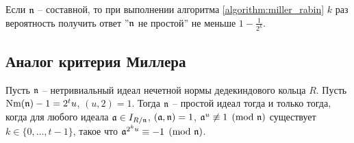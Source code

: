 \documentclass[_00_dissertation.tex]{subfiles}
\begin{document}
\begin{remark}
    Если $\mathfrak{n}$ -- составной, то при выполнении алгоритма \ref{algorithm:miller_rabin} $k$ раз вероятность получить ответ ''$\mathfrak{n}$ не простой'' не меньше $1 - \frac{1}{2^k}$.
\end{remark}

\subsection{Аналог критерия Миллера}

\begin{theorem}\label{theorem:miller_criteria}
    Пусть $\mathfrak{n}$ -- нетривиальный идеал нечетной нормы дедекиндового кольца $R$.
    Пусть $\textrm{Nm}(\mathfrak{n}) - 1 = 2^t u$, $(u, 2) = 1$.
    Тогда $\mathfrak{n}$ -- простой идеал тогда и только тогда, когда для любого идеала $\mathfrak{a} \in I_{R/\mathfrak{n}}$, $(\mathfrak{a}, \mathfrak{n}) = 1$, $\mathfrak{a}^u \not\equiv 1 \pmod{\mathfrak{n}}$ существует $k\in \{0, \dots, t-1\}$, такое что $\mathfrak{a}^{2^{k}u} \equiv -1 \pmod{\mathfrak{n}}$.
\end{theorem}
\end{document}

